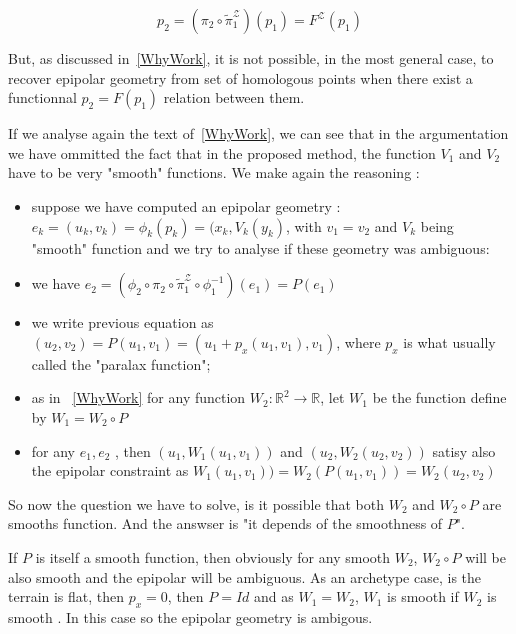 \documentclass{ipol}
\newcommand{\RR}{\ensuremath{\mathbb{R}}}
\newcommand{\PiZVert}{\widetilde{\pi}_1^{\mathcal{Z}} }
\begin{document}
\begin{equation}
   p_2 = (\pi_2 \circ  \PiZVert) (p_1) = F^\mathcal{Z}(p_1)
\end{equation}


But, as discussed in~\ref{WhyWork}, it is not possible, in the most general
case, to recover epipolar geometry from set of homologous points when there exist
a functionnal $p_2=F(p_1)$ relation between them. 

 If  we analyse again the text of~\ref{WhyWork},
we can see that in the argumentation we have ommitted the fact that in the proposed method,
the function $V_1$ and $V_2$ have to be very "smooth" functions. 
We make again the reasoning :

\begin{itemize}
   \item suppose we have computed an epipolar geometry  : $e_k=(u_k,v_k)=\phi_k(p_k) = (x_k,V_k(y_k)$,
         with $v_1=v_2$ and $V_k$ being "smooth" function and we try to analyse if these
         geometry was ambiguous:

   \item  we have $e_2 = (\phi_2 \circ  \pi_2 \circ  \PiZVert \circ  \phi_1^{-1}) (e_1) = P(e_1)$

    \item we write  previous equation as $(u_2,v_2) = P(u_1,v_1) = (u_1 + p_x(u_1,v_1),v_1)$,  where
          $p_x$ is what usually called the "paralax function"; 

   \item as in ~\ref{WhyWork}  for any function $W_2 : \RR^2 \rightarrow \RR  $, let $W_1$ be the function
         define by $W_1 = W_2 \circ P$

   \item for any $e_1,e_2$ , then $(u_1,W_1(u_1,v_1))$ and $(u_2,W_2(u_2,v_2))$ satisy also the epipolar constraint
         as $W_1(u_1,v_1)) = W_2 (P(u_1,v_1)) = W_2(u_2,v_2)$

\end{itemize}

So now the question we have to solve, is it possible that both $W_2$ and $W_2 \circ P$ are
smooths function. And the answser is "it depends of the smoothness of $P$".

If $P$ is itself a smooth function, then obviously for any smooth $W_2$,  $W_2 \circ P$  will
be also smooth and the epipolar will be ambiguous.  As an archetype case, is the terrain is
flat, then $p_x=0$, then  $P=Id$ and as $W_1=W_2$, $W_1$ is smooth if $W_2$ is smooth . 
In this case so the epipolar geometry is ambigous.
\end{document}
